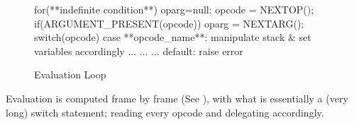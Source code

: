 \documentclass[12pt, a4paper]{report}
\newenvironment{code}
{\footnotesize\verbatim}{\endverbatim\normalfont}
\theoremstyle{definition}
\theoremstyle{definition}%
\theoremstyle{definition}%
\theoremstyle{definition}%
\theoremstyle{definition}%
\theoremstyle{definition}%
\begin{document}
        \begin{figure}
            \centering
            \begin{code}
                for(**indefinite condition**){
                    oparg=null;
                    opcode = NEXTOP();
                    if(ARGUMENT_PRESENT(opcode)){
                        oparg = NEXTARG();
                    }
                    switch(opcode){
                        case **opcode_name**: 
                            manipulate stack & set variables accordingly
                        ...
                        ...
                        ...
                        default: 
                            raise error
                    }
                }
                            
            \end{code}
            \caption{Evaluation Loop}
            \label{lst:ceval_loop}

            \end{figure}
            Evaluation is computed frame by frame (See {\bfseries{}}), with what is essentially a (very long) switch statement; reading every opcode and delegating accordingly.
            
\end{document}
